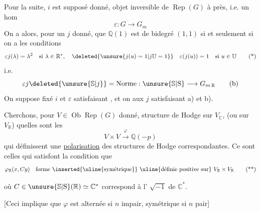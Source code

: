 Pour la suite, $i$ est supposé donné,  objet inversible  de $\operatorname{Rep}(G)$ à  près, i.e. un hom \unsure{$\varepsilon$}
\[
\varepsilon:G\longrightarrow G_m
\]
On a alors, pour un $j$ donné, que $\mathbb{Q}(1)$ est de bidegré $(1,1)$ si et seulement si on a les conditions
\[
\varepsilon j(\lambda)=\lambda^2\quad\text{si }\lambda\in\mathbb{R}^{*},\quad
\deleted{\unsure{j(u)=1|j\mathbb{U}=1}}\quad
\varepsilon(j(u))=1\quad\text{si }u\in\mathbb{U}\tag*{(*)}
\]
i.e.
\[
\varepsilon j\deleted{\unsure{\mathbb{S}|j}}=\mathrm{Norme}:\unsure{\mathbb{S}|\mathrm{S}}\longrightarrow G_{m\,\mathbb{R}}\tag*{(b)}
\]
On suppose fixé $i$ et $\varepsilon$ satisfaisant , et on  aux $j$ satisfaisant a) et b).

 Cherchons, pour $V\in\operatorname{Ob}\operatorname{Rep}(G)$ donné,  structure de Hodge sur $V_{\mathbb{C}}$, (ou sur $V_{\mathbb{R}}$) quelles sont les 
\[
V\times V\xrightarrow{\varphi}\mathbb{Q}(-p)
\]
qui définissent une \uline{polarisation} des structures de Hodge correspondantes. Ce sont celles qui satisfont  la condition que
\[
\varphi_{\mathbb{R}}(x,Cy)\quad\text{forme \inserted{\uline{symétrique}} \uline{définie positive sur} } V_{\mathbb{R}}\times V_{\mathbb{R}}\tag*{(**)}
\]

où $C\in\unsure{\mathbb{S}|\mathrm{S}}(\mathbb{R})\simeq\mathbb{C}^{*}$ correspond à l' $\sqrt{-1}$ de $\mathbb{C}^{*}$.

[Ceci implique que $\varphi$ est alternée si $n$ impair, symétrique si $n$ pair]


